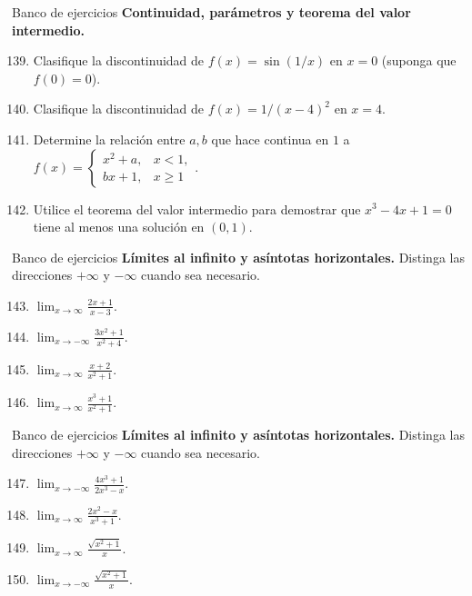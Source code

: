 \documentclass[12pt,aspectratio=169]{beamer}
\begin{document}
\begin{frame}[t,allowframebreaks]{Banco de ejercicios}
\small
\noindent \textbf{Continuidad, parámetros y teorema del valor intermedio.}\par\smallskip
\begin{enumerate}\setcounter{enumi}{138}
\item Clasifique la discontinuidad de $f(x)=\sin(1/x)$ en $x=0$ (suponga que $f(0)=0$).
\item Clasifique la discontinuidad de $f(x)=1/(x-4)^2$ en $x=4$.
\item Determine la relación entre $a,b$ que hace continua en $1$ a $f(x)=\begin{cases}x^2+a,&x<1,\\bx+1,&x\ge1\end{cases}$.
\item Utilice el teorema del valor intermedio para demostrar que $x^3-4x+1=0$ tiene al menos una solución en $(0,1)$.
\end{enumerate}
\end{frame}


\begin{frame}[t,allowframebreaks]{Banco de ejercicios}
\small
\noindent \textbf{Límites al infinito y asíntotas horizontales.} Distinga las direcciones $+\infty$ y $-\infty$ cuando sea necesario.\par\smallskip
\begin{enumerate}\setcounter{enumi}{142}
\item $\displaystyle\lim_{x\to\infty}\frac{2x+1}{x-3}$.
\item $\displaystyle\lim_{x\to-\infty}\frac{3x^2+1}{x^2+4}$.
\item $\displaystyle\lim_{x\to\infty}\frac{x+2}{x^2+1}$.
\item $\displaystyle\lim_{x\to\infty}\frac{x^3+1}{x^2+1}$.
\end{enumerate}
\end{frame}


\begin{frame}[t,allowframebreaks]{Banco de ejercicios}
\small
\noindent \textbf{Límites al infinito y asíntotas horizontales.} Distinga las direcciones $+\infty$ y $-\infty$ cuando sea necesario.\par\smallskip
\begin{enumerate}\setcounter{enumi}{146}
\item $\displaystyle\lim_{x\to-\infty}\frac{4x^3+1}{2x^3-x}$.
\item $\displaystyle\lim_{x\to\infty}\frac{2x^2-x}{x^3+1}$.
\item $\displaystyle\lim_{x\to\infty}\frac{\sqrt{x^2+1}}{x}$.
\item $\displaystyle\lim_{x\to-\infty}\frac{\sqrt{x^2+1}}{x}$.
\end{enumerate}
\end{frame}
\end{document}
